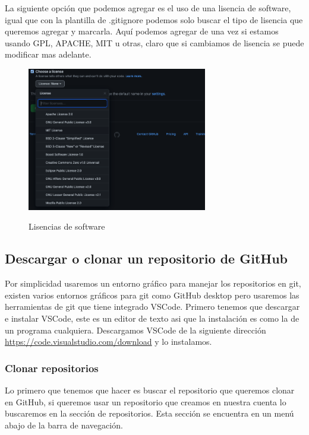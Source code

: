\documentclass[11pt, oneside]{article}
\begin{document}
La siguiente opción que podemos agregar es el uso de una lisencia de software, igual que con la plantilla de .gitignore podemos solo buscar el tipo de lisencia que queremos agregar y marcarla. Aquí podemos agregar de una vez si estamos usando GPL, APACHE, MIT u otras, claro que si cambiamos de lisencia se puede modificar mas adelante.

\begin{figure}[H]
  \centering
  \caption{Lisencias de software}
  \includegraphics[width=0.70\textwidth]{./img/github-new-repo-5.png}
  \label{fig:github-new-repo-5}
\end{figure}

\subsection{Descargar o clonar un repositorio de GitHub}

Por simplicidad usaremos un entorno gráfico para manejar los repositorios en git, existen varios entornos gráficos para git como GitHub desktop pero usaremos las herramientas de git que tiene integrado VSCode. Primero tenemos que descargar e instalar VSCode, este es un editor de texto asi que la instalación es como la de un programa cualquiera. Descargamos VSCode de la siguiente dirección \url{https://code.visualstudio.com/download} y lo instalamos.

\subsubsection{Clonar repositorios}

Lo primero que tenemos que hacer es buscar el repositorio que queremos clonar en GitHub, si queremos usar un repositorio que creamos en nuestra cuenta lo buscaremos en la sección de repositorios. Esta sección se encuentra en un menú abajo de la barra de navegación.
\end{document}
